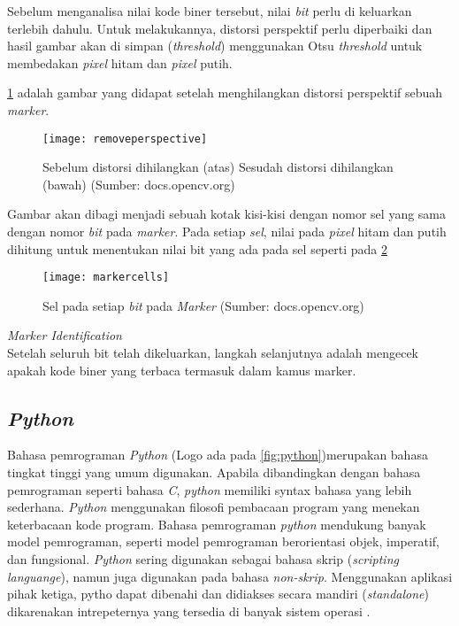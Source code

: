 \begin{packed_item}
\begin{packed_enum}
			Sebelum menganalisa nilai kode biner tersebut, nilai \textit{bit} perlu di keluarkan terlebih dahulu. Untuk melakukannya, distorsi perspektif perlu diperbaiki dan hasil gambar akan di simpan (\textit{threshold}) menggunakan Otsu \textit{threshold} untuk membedakan \textit{pixel} hitam dan \textit{pixel} putih.
			
			\cref{fig:removeperspective} adalah gambar yang didapat setelah menghilangkan distorsi perspektif sebuah \textit{marker}.
			
			\begin{figure}[H]
				\centering
				\texttt{[image: removeperspective]}
				\caption{Sebelum distorsi dihilangkan (atas) Sesudah distorsi dihilangkan (bawah) (Sumber: docs.opencv.org)}
				\label{fig:removeperspective}
			\end{figure}
			
			Gambar akan dibagi menjadi sebuah kotak kisi-kisi dengan nomor sel yang sama dengan nomor \textit{bit} pada \textit{marker}. Pada setiap \textit{sel}, nilai pada \textit{pixel} hitam dan putih dihitung untuk menentukan nilai bit yang ada pada sel seperti pada \cref{fig:markercells}
			
			\begin{figure}[H]
				\centering
				\texttt{[image: markercells]}
				\caption{Sel pada setiap \textit{bit} pada \textit{Marker} (Sumber: docs.opencv.org)}
				\label{fig:markercells}
			\end{figure}
			
			\item \textit{Marker Identification}
			\\ Setelah seluruh bit telah dikeluarkan, langkah selanjutnya adalah mengecek apakah kode biner yang terbaca termasuk dalam kamus marker.
		
		\end{packed_enum}
\end{packed_item}

\subsection{\textit{Python}}
Bahasa pemrograman \textit{Python} (Logo ada pada \cref{fig:python})merupakan bahasa tingkat tinggi yang umum digunakan. Apabila dibandingkan dengan bahasa pemrograman seperti bahasa \textit{C}, \textit{python} memiliki syntax bahasa yang lebih sederhana. \textit{Python} menggunakan filosofi pembacaan program yang menekan keterbacaan kode program. Bahasa pemrograman \textit{python} mendukung banyak model pemrograman, seperti model pemrograman berorientasi objek, imperatif, dan fungsional. \textit{Python} sering digunakan sebagai bahasa skrip (\textit{scripting languange}), namun juga digunakan pada bahasa \textit{non-skrip}. Menggunakan aplikasi pihak ketiga, pytho dapat dibenahi dan didiakses secara mandiri (\textit{standalone}) dikarenakan intrepeternya yang tersedia di banyak sistem operasi \citep{van2007python}.


